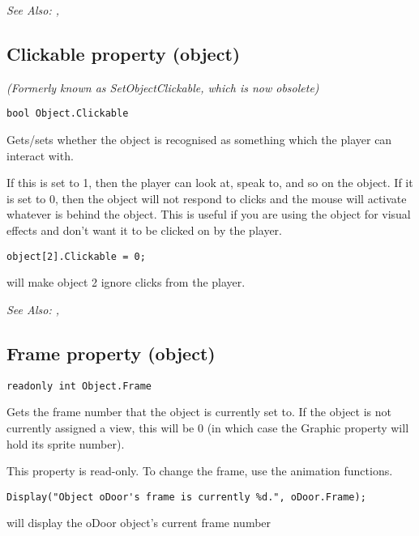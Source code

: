 \it{See Also:} ,


\subsection{Clickable property (object)}\label{Object.Clickable}%

\it{(Formerly known as SetObjectClickable, which is now obsolete)}

\begin{verbatim}
bool Object.Clickable
\end{verbatim}
Gets/sets whether the object is recognised as something which the player can
interact with.

If this is set to 1, then the player can look at, speak to, and so on the
object. If it is set to 0, then the object will not respond to clicks and
the mouse will activate whatever is behind the object.
This is useful if you are using the object for visual effects and don't
want it to be clicked on by the player.

\begin{verbatim}
object[2].Clickable = 0;
\end{verbatim}
will make object 2 ignore clicks from the player.

\it{See Also:} ,


\subsection{Frame property (object)}\label{Object.Frame}%

\begin{verbatim}
readonly int Object.Frame
\end{verbatim}
Gets the frame number that the object is currently set to. If the object is not currently
assigned a view, this will be 0 (in which case the Graphic property will
hold its sprite number).

This property is read-only. To change the frame, use the animation functions.

\begin{verbatim}
Display("Object oDoor's frame is currently %d.", oDoor.Frame);
\end{verbatim}
will display the oDoor object's current frame number


